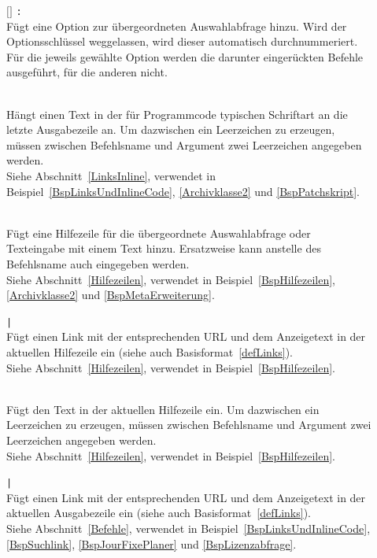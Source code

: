\begin{description}
\item[\cidxfrag{\#}] $[$$]$ \verb|:| \\
Fügt eine Option zur übergeordneten Auswahlabfrage hinzu. Wird der Optionsschlüssel weggelassen, wird dieser automatisch durchnummeriert.
Für die jeweils gewählte Option werden die darunter eingerückten Befehle ausgeführt, für die anderen nicht.\\

\item[] \\
Hängt einen Text in der für Programmcode typischen Schriftart an die letzte Ausgabezeile an. Um dazwischen ein Leerzeichen zu erzeugen, müssen zwischen Befehlsname und Argument zwei Leerzeichen angegeben werden.\\
Siehe Abschnitt~\ref{LinksInline}, verwendet in Beispiel~\ref{BspLinksUndInlineCode}, \ref{Archivklasse2} und \ref{BspPatchskript}.

\item[] \\
Fügt eine Hilfezeile für die übergeordnete Auswahlabfrage oder Texteingabe mit einem Text hinzu. Ersatzweise kann anstelle des Befehlsname auch \cidxfrag{\&>} eingegeben werden.\\
Siehe Abschnitt~\ref{Hilfezeilen}, verwendet in Beispiel~\ref{BspHilfezeilen}, \ref{Archivklasse2} und \ref{BspMetaErweiterung}.

\item[]  \verb=|= \\
Fügt einen Link mit der entsprechenden URL und dem Anzeigetext in der aktuellen Hilfezeile ein (siehe auch Basisformat~\ref{defLinks}).\\
Siehe Abschnitt~\ref{Hilfezeilen}, verwendet in Beispiel~\ref{BspHilfezeilen}.

\item[] \\
Fügt den Text  in der aktuellen Hilfezeile ein. Um dazwischen ein Leerzeichen zu erzeugen, müssen zwischen Befehlsname und Argument zwei Leerzeichen angegeben werden.\\
Siehe Abschnitt~\ref{Hilfezeilen}, verwendet in Beispiel~\ref{BspHilfezeilen}.

\item[]  \verb=|= \\
Fügt einen Link mit der entsprechenden URL und dem Anzeigetext in der aktuellen Ausgabezeile ein (siehe auch Basisformat~\ref{defLinks}).\\
Siehe Abschnitt~\ref{Befehle}, verwendet in Beispiel~\ref{BspLinksUndInlineCode}, \ref{BspSuchlink}, \ref{BspJourFixePlaner} und \ref{BspLizenzabfrage}.


\end{description}
